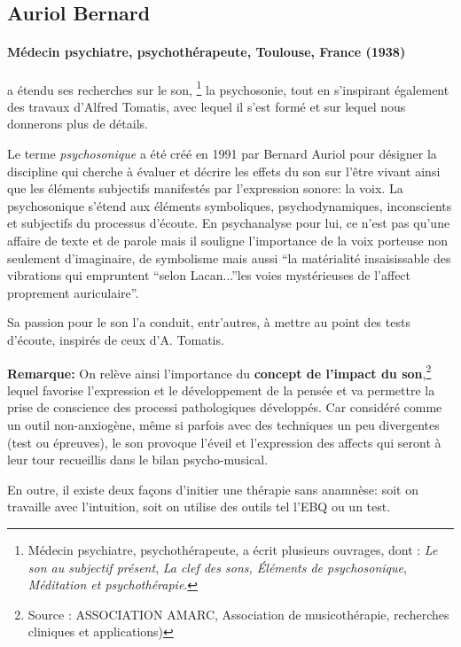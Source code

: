       \subsection{Auriol Bernard}
 
\paragraph{Médecin psychiatre,
   psychothérapeute, Toulouse, France (1938)}
a étendu ses recherches sur le son, \footnote{Médecin psychiatre, psychothérapeute,  a écrit plusieurs ouvrages, dont : \textsl{Le son au subjectif présent}, \textsl{La clef des sons, Éléments de psychosonique}, \textsl{Méditation et
  psychothérapie}.} la psychosonie, 
tout en s'inspirant également des
travaux d'Alfred Tomatis, avec lequel il s'est formé et sur lequel
nous donnerons plus de détails.

Le terme \emph{psychosonique} a été créé en 1991 par Bernard Auriol pour
désigner la discipline qui cherche à évaluer et décrire les effets du
son sur l'être vivant ainsi que les éléments
subjectifs manifestés par l'expression sonore:  la
voix. La psychosonique s'étend aux éléments
symboliques, psychodynamiques, inconscients et subjectifs du processus
d'écoute. En psychanalyse pour lui, ce n'est pas qu'une affaire de
texte et de parole mais il souligne l'importance de la voix porteuse non seulement
d'imaginaire, de symbolisme mais aussi ``la matérialité insaisissable
des vibrations qui empruntent ``selon Lacan...''les voies mystérieuses de
l'affect proprement auriculaire''.

\autocite[ch. 13]{auriol:cle}

Sa passion pour le son l'a conduit, entr'autres, à mettre au point des tests
d'écoute, inspirés de ceux d'A. Tomatis.




\textbf{Remarque: } 
On relève ainsi l'importance du \textbf{concept de l'impact du son},\footnote{Source : ASSOCIATION AMARC,
  Association de musicothérapie, recherches cliniques et
  applications) } 
lequel favorise l'expression et le développement de la pensée et va
permettre la prise de conscience des processi pathologiques
développés. Car considéré comme un outil non-anxiogène, même si parfois avec des
techniques un peu divergentes (test ou épreuves), le son provoque l'éveil et l'expression
des affects qui seront à leur tour recueillis dans le bilan psycho-musical.

En outre, il existe deux façons d'initier une thérapie sans anamnèse: soit on
travaille avec l'intuition, soit on utilise des outils tel l'EBQ ou un test.

